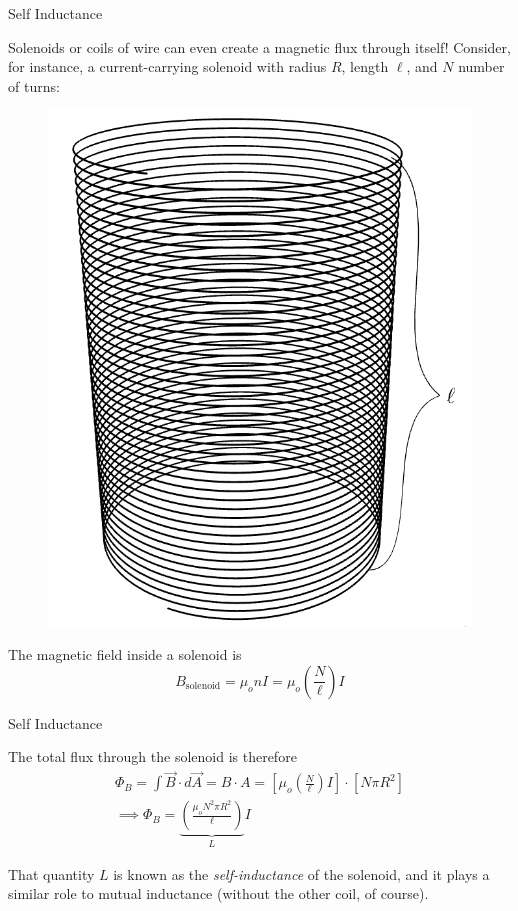 \documentclass{beamer}
\begin{document}
\begin{frame}{Self Inductance}

Solenoids or coils of wire can even create a magnetic flux through itself! Consider, for instance, a current-carrying solenoid with radius $R$, length $\ell$, and $N$ number of turns:

\begin{figure}[H]
\centering
\includegraphics[height=0.45\textheight]{figures/solenoid.png}
\end{figure}

The magnetic field inside a solenoid is
\begin{equation*}
    B_{\text{solenoid}} = \mu_o n I = \mu_o \left( \frac{N}{\ell} \right) I
\end{equation*}

\end{frame}

\begin{frame}{Self Inductance}

The total flux through the solenoid is therefore
\begin{gather*}
    \Phi_B = \int \vec{B} \cdot d\vec{A} = B \cdot A = \left[ \mu_o \left( \frac{N}{\ell} \right) I \right] \cdot \left[ N \pi R^2 \right] \\[1em]
    \implies \Phi_B = \underbrace{\left( \frac{\mu_o N^2 \pi R^2}{\ell} \right)}_{L} I
\end{gather*}

\vfill

That quantity $L$ is known as the \emph{self-inductance} of the solenoid, and it plays a similar role to mutual inductance (without the other coil, of course).

\end{frame}
\end{document}
